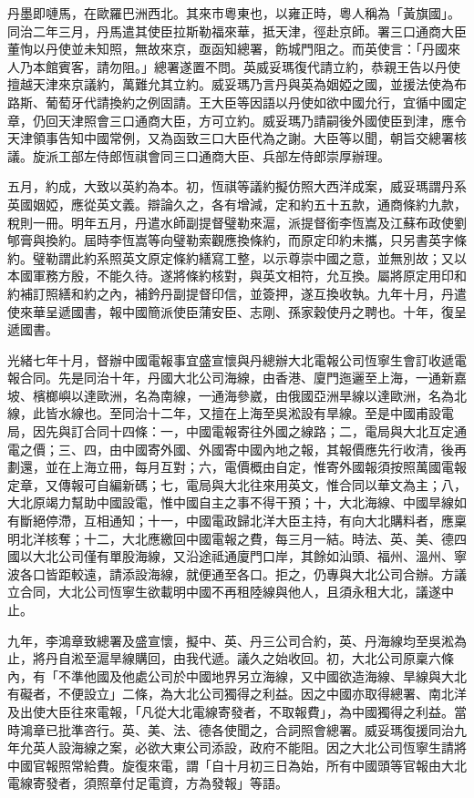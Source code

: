 \begin{pinyinscope}
丹墨即嗹馬，在歐羅巴洲西北。其來市粵東也，以雍正時，粵人稱為「黃旗國」。同治二年三月，丹馬遣其使臣拉斯勒福來華，抵天津，徑赴京師。署三口通商大臣董恂以丹使並未知照，無故來京，亟函知總署，飭城門阻之。而英使言：「丹國來人乃本館賓客，請勿阻。」總署遂置不問。英威妥瑪復代請立約，恭親王告以丹使擅越天津來京議約，萬難允其立約。威妥瑪乃言丹與英為姻婭之國，並援法使為布路斯、葡萄牙代請換約之例固請。王大臣等因語以丹使如欲中國允行，宜循中國定章，仍回天津照會三口通商大臣，方可立約。威妥瑪乃請嗣後外國使臣到津，應令天津領事告知中國常例，又為函致三口大臣代為之謝。大臣等以聞，朝旨交總署核議。旋派工部左侍郎恆祺會同三口通商大臣、兵部左侍郎崇厚辦理。

五月，約成，大致以英約為本。初，恆祺等議約擬仿照大西洋成案，威妥瑪謂丹系英國姻婭，應從英文義。辯論久之，各有增減，定和約五十五款，通商條約九款，稅則一冊。明年五月，丹遣水師副提督璧勒來滬，派提督銜李恆嵩及江蘇布政使劉郇膏與換約。屆時李恆嵩等向璧勒索觀應換條約，而原定印約未攜，只另書英字條約。璧勒謂此約系照英文原定條約繕寫工整，以示尊崇中國之意，並無別故；又以本國軍務方殷，不能久待。遂將條約核對，與英文相符，允互換。屬將原定用印和約補訂照繕和約之內，補鈐丹副提督印信，並簽押，遂互換收執。九年十月，丹遣使來華呈遞國書，報中國簡派使臣蒲安臣、志剛、孫家穀使丹之聘也。十年，復呈遞國書。

光緒七年十月，督辦中國電報事宜盛宣懷與丹總辦大北電報公司恆寧生會訂收遞電報合同。先是同治十年，丹國大北公司海線，由香港、廈門迤邐至上海，一通新嘉坡、檳榔嶼以達歐洲，名為南線，一通海參崴，由俄國亞洲旱線以達歐洲，名為北線，此皆水線也。至同治十二年，又擅在上海至吳淞設有旱線。至是中國甫設電局，因先與訂合同十四條：一，中國電報寄往外國之線路；二，電局與大北互定通電之價；三、四，由中國寄外國、外國寄中國內地之報，其報價應先行收清，後再劃還，並在上海立冊，每月互對；六，電價概由自定，惟寄外國報須按照萬國電報定章，又傳報可自編新碼；七，電局與大北往來用英文，惟合同以華文為主；八，大北原竭力幫助中國設電，惟中國自主之事不得干預；十，大北海線、中國旱線如有斷絕停滯，互相通知；十一，中國電政歸北洋大臣主持，有向大北購料者，應稟明北洋核奪；十二，大北應繳回中國電報之費，每三月一結。時法、英、美、德四國以大北公司僅有單股海線，又沿途祗通廈門口岸，其餘如汕頭、福州、溫州、寧波各口皆距較遠，請添設海線，就便通至各口。拒之，仍專與大北公司合辦。方議立合同，大北公司恆寧生欲載明中國不再租陸線與他人，且須永租大北，議遂中止。

九年，李鴻章致總署及盛宣懷，擬中、英、丹三公司合約，英、丹海線均至吳淞為止，將丹自淞至滬旱線購回，由我代遞。議久之始收回。初，大北公司原稟六條內，有「不準他國及他處公司於中國地界另立海線，又中國欲造海線、旱線與大北有礙者，不便設立」二條，為大北公司獨得之利益。因之中國亦取得總署、南北洋及出使大臣往來電報，「凡從大北電線寄發者，不取報費」，為中國獨得之利益。當時鴻章已批準咨行。英、美、法、德各使聞之，合詞照會總署。威妥瑪復援同治九年允英人設海線之案，必欲大東公司添設，政府不能阻。因之大北公司恆寧生請將中國官報照常給費。旋復來電，謂「自十月初三日為始，所有中國頭等官報由大北電線寄發者，須照章付足電資，方為發報」等語。


\end{pinyinscope}
